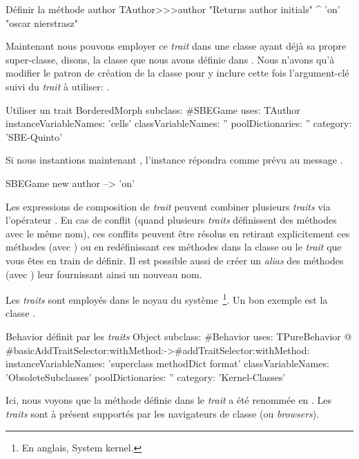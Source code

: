 \documentclass[a4paper,10pt,twoside]{book}
\begin{document}
\begin{method}[author]{D\'efinir la m\'ethode author}
TAuthor>>>author
    "Returns author initials"
	^ 'on'    "oscar nierstrasz"
\end{method}

\noindent
Maintenant nous pouvons employer ce \emph{trait} dans une classe ayant d\'ej\`a sa propre super-classe, disons, la classe  que nous avons d\'efinie dans .
Nous n'avons qu'\`a modifier le patron de cr\'eation de la classe  pour y inclure cette fois l'argument-cl\'e  suivi du \emph{trait} \`a utiliser: .

\begin{classdef}[sbegamewithtrait]{Utiliser un trait}
BorderedMorph subclass: #SBEGame
	uses: TAuthor
	instanceVariableNames: 'cells'
	classVariableNames: ''
	poolDictionaries: ''
	category: 'SBE-Quinto'
\end{classdef}

Si nous instantions maintenant , l'instance r\'epondra comme pr\'evu au message .

\begin{code}{}
SBEGame new author --> 'on'
\end{code}

Les expressions de composition de \emph{trait} peuvent combiner plusieurs \emph{traits} via l'op\'erateur \ct{+}.
En cas de conflit (\ie quand plusieurs \emph{traits} d\'efinissent des m\'ethodes avec le m\^eme nom), ces conflits peuvent \^etre r\'esolus en retirant explicitement ces m\'ethodes (avec \ct{-}) ou en red\'efinissant ces m\'ethodes dans la classe ou le \emph{trait} que vous \^etes en train de d\'efinir.
Il est possible aussi de cr\'eer un \emph{alias} des m\'ethodes (avec ) 
leur fournissant ainsi un nouveau nom.

Les \emph{traits} sont employ\'es dans le noyau du syst\`eme~\footnote{En anglais, System kernel.}.
Un bon exemple est la classe .

\begin{classdef}[behaviorwithtraits]{Behavior d\'efinit par les \emph{traits}}
Object subclass: #Behavior
	uses: TPureBehavior @ {#basicAddTraitSelector:withMethod:->#addTraitSelector:withMethod:}
	instanceVariableNames: 'superclass methodDict format'
	classVariableNames: 'ObsoleteSubclasses'
	poolDictionaries: ''
	category: 'Kernel-Classes'
\end{classdef}
\noindent
Ici, nous voyons que la m\'ethode  d\'efinie dans le \emph{trait}  a \'et\'e renomm\'ee en \mbox{.}
Les \emph{traits} sont \`a pr\'esent support\'es par les navigateurs de classe (ou \emph{browsers}).
\end{document}
